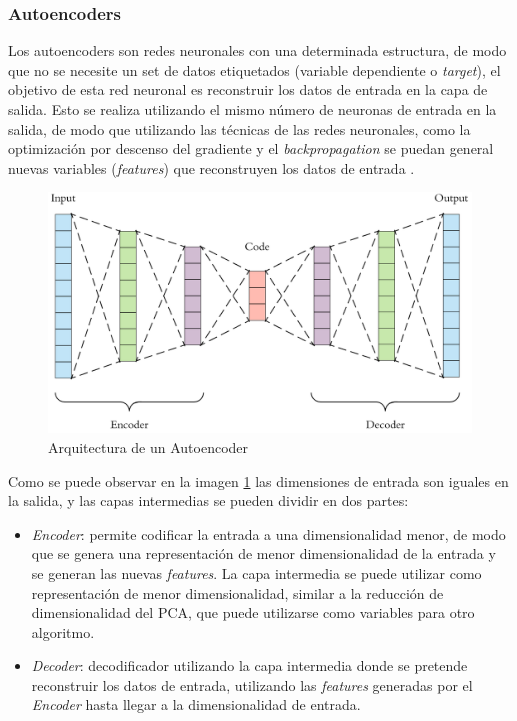 \subsubsection{Autoencoders}
\label{subsubsection:Autoencoders}

Los autoencoders son redes neuronales con una determinada estructura, de modo que no se necesite un set de datos etiquetados (variable dependiente o \textit{target}), el objetivo de esta red neuronal es reconstruir los datos de entrada en la capa de salida. Esto se realiza utilizando el mismo número de neuronas de entrada en la salida, de modo que utilizando las técnicas de las redes neuronales, como la optimización por descenso del gradiente y el \textit{backpropagation} se puedan general nuevas variables (\textit{features}) que reconstruyen los datos de entrada \cite{ng2011sparse}.

\begin{figure}[H]
    \centering
    \includegraphics[width=12cm]{figs/autoencoder.png}
    \caption{Arquitectura de un Autoencoder}
    \label{fig:autoencoder}
\end{figure}

Como se puede observar en la imagen \ref{fig:autoencoder} las dimensiones de entrada son iguales en la salida, y las capas intermedias se pueden dividir en dos partes:

\begin{itemize}
    \item \textit{Encoder}: permite codificar la entrada a una dimensionalidad menor, de modo que se genera una representación de menor dimensionalidad de la entrada y se generan las nuevas \textit{features}. La capa intermedia se puede utilizar como representación de menor dimensionalidad, similar a la reducción de dimensionalidad del PCA, que puede utilizarse como variables para otro algoritmo.
    \item \textit{Decoder}: decodificador utilizando la capa intermedia donde se pretende reconstruir los datos de entrada, utilizando las \textit{features} generadas por el \textit{Encoder} hasta llegar a la dimensionalidad de entrada.
\end{itemize}

